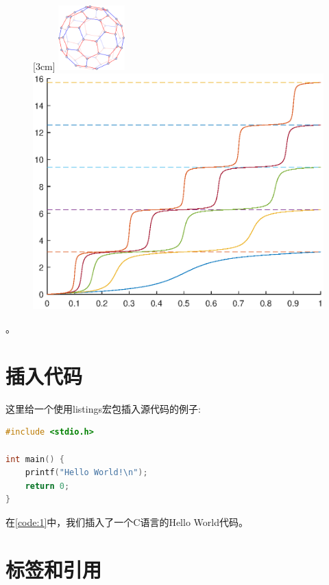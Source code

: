 \begin{figure}[htp]
	\centering
	[3cm] %
	{\includegraphics[height=2.5cm]{figure/example/m2.pdf}}
	\hspace{4em}
	{	\includegraphics[scale=0.5]{figure/example/purfer_left.eps}}
	\label{fig4}
\end{figure}。

\section{插入代码}

这里给一个使用listings宏包插入源代码的例子:
\begin{lstlisting}[language={C}, caption={一段C源代码}, label=code:1]
#include <stdio.h>

int main() {
    printf("Hello World!\n");
    return 0;
}
\end{lstlisting}
在\autoref{code:1}中，我们插入了一个C语言的Hello World代码。

\section{标签和引用}

